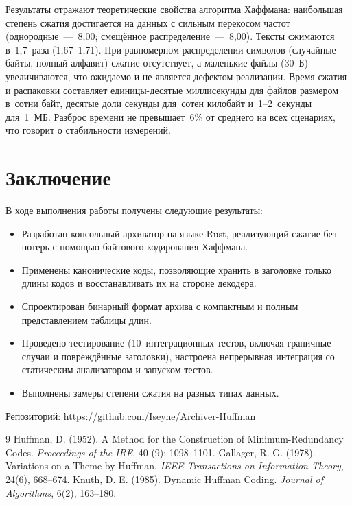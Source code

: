 \documentclass[a4paper]{article}
\begin{document}
Результаты отражают теоретические свойства алгоритма Хаффмана:
наибольшая степень сжатия достигается на данных с сильным перекосом
частот (однородные~---~8,00; смещённое распределение~---~8,00).
Тексты сжимаются в~1,7~раза (1,67--1,71). При равномерном
распределении символов (случайные байты, полный алфавит) сжатие
отсутствует, а маленькие файлы (30~Б) увеличиваются, 
что ожидаемо и не является дефектом реализации. Время сжатия
и распаковки составляет единицы-десятые миллисекунды для файлов размером в~сотни байт,
десятые доли секунды для~сотен килобайт и~1--2~секунды для~1~МБ.
Разброс времени не превышает~6\% от среднего на всех сценариях,
что говорит о стабильности измерений.

\section{Заключение}

В ходе выполнения работы получены следующие результаты:

\begin{itemize}
    \item Разработан консольный архиватор на языке Rust, реализующий 
          сжатие без потерь с помощью байтового кодирования Хаффмана.
    \item Применены канонические коды, позволяющие хранить в заголовке 
          только длины кодов и восстанавливать их на стороне декодера.
    \item Спроектирован бинарный формат архива с компактным и полным 
          представлением таблицы длин.
    \item Проведено тестирование (10~интеграционных тестов, включая 
          граничные случаи и повреждённые заголовки), настроена 
          непрерывная интеграция со статическим анализатором и запуском тестов.
    \item Выполнены замеры степени сжатия на разных типах данных.
\end{itemize}

Репозиторий: \url{https://github.com/Iseyne/Archiver-Huffman}

\begin{thebibliography}{9}
 Huffman, D. (1952). A Method for the Construction of Minimum-Redundancy Codes.
\textit{Proceedings of the IRE}. 40 (9): 1098--1101.
 Gallager, R. G. (1978). Variations on a Theme by Huffman.
\textit{IEEE Transactions on Information Theory}, 24(6), 668--674.
 Knuth, D. E. (1985). Dynamic Huffman Coding.
\textit{Journal of Algorithms}, 6(2), 163--180.
\end{thebibliography}
\end{document}
